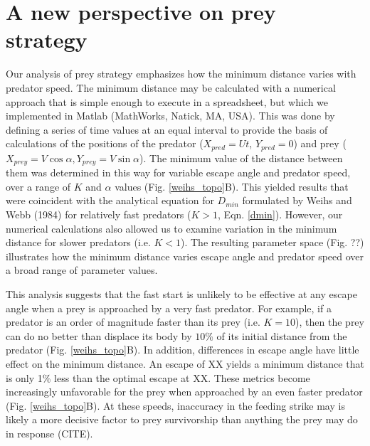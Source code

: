 \documentclass[12pt]{article}
\begin{document}
\section{A new perspective on prey strategy}

Our analysis of prey strategy emphasizes how the minimum distance varies with predator speed. The minimum distance may be calculated with a numerical approach that is simple enough to execute in a spreadsheet, but which we implemented in Matlab (MathWorks, Natick, MA, USA). This was done by defining a series of time values at an equal interval to provide the basis of calculations of the positions of the predator ($X_{pred} = Ut$, $Y_{pred} = 0$) and prey ($X_{prey}=V\cos\alpha,Y_{prey}=V\sin\alpha$). The minimum value of the distance between them was determined in this way for variable escape angle and predator speed, over a range of $K$ and $\alpha$ values (Fig. \ref{weihs_topo}B). This yielded results that were coincident with the analytical equation for $D_{min}$ formulated by Weihs and Webb (1984) for relatively fast predators ($K>1$, Eqn. \ref{dmin}). However, our numerical calculations also allowed us to examine variation in the minimum distance for slower predators (i.e. $K<1$). The resulting parameter space (Fig. ??) illustrates how the minimum distance varies escape angle and predator speed over a broad range of parameter values.

This analysis suggests that the fast start is unlikely to be effective at any escape angle when a prey is approached by a very fast predator. For example, if a predator is an order of magnitude faster than its prey (i.e. $K=10$), then the prey can do no better than displace its body by $10\%$ of its initial distance from the predator (Fig. \ref{weihs_topo}B). In addition, differences in escape angle have little effect on the minimum distance. An escape of  XX\textdegree\hspace{2pt} yields a minimum distance that is only 1\% less than the optimal escape at XX\textdegree. These metrics become increasingly unfavorable for the prey when approached by an even faster predator (Fig. \ref{weihs_topo}B). At these speeds, inaccuracy in the feeding strike may is likely a more decisive factor to prey survivorship than anything the prey may do in response (CITE).
\end{document}
